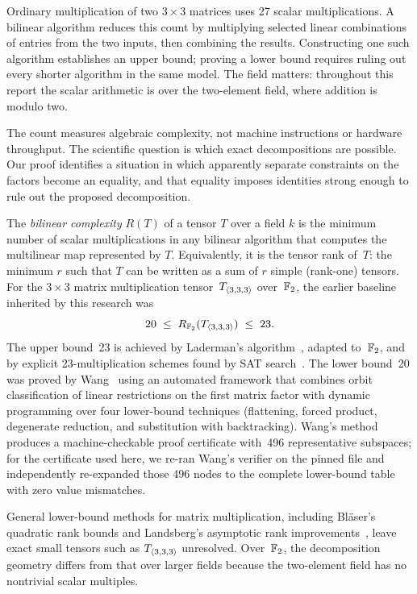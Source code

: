 \documentclass[11pt,a4paper]{article}
\begin{document}
Ordinary multiplication of two $3\times3$ matrices uses 27 scalar
multiplications. A bilinear algorithm reduces this count by multiplying selected
linear combinations of entries from the two inputs, then combining the
results. Constructing one such algorithm establishes an upper bound;
proving a lower bound requires ruling out every shorter algorithm in the
same model. The field matters: throughout this report the scalar arithmetic
is over the two-element field, where addition is modulo two.

The count measures algebraic complexity, not machine instructions or
hardware throughput. The scientific question is which exact decompositions
are possible. Our proof identifies a situation in which apparently separate
constraints on the factors become an equality, and that equality imposes
identities strong enough to rule out the proposed decomposition.

The \emph{bilinear complexity} $R(T)$ of a tensor $T$ over a field $k$ is the minimum number of scalar multiplications in any bilinear algorithm that computes the multilinear map represented by $T$.  Equivalently, it is the tensor rank of~$T$: the minimum $r$ such that $T$ can be written as a sum of $r$ simple (rank-one) tensors. For the $3\times3$ matrix multiplication tensor~$T_{\langle3,3,3\rangle}$ over~$\mathbb{F}_2$, the earlier baseline inherited by this research was
\[
  20\;\le\;R_{\mathbb{F}_2}(T_{\langle3,3,3\rangle})\;\le\;23.
\]
The upper bound~23 is achieved by Laderman's algorithm~\cite{laderman1976noncommutative}, adapted to~$\mathbb{F}_2$, and by explicit 23-multiplication schemes found by SAT search~\cite{heule2019waysa}.  The lower bound~20 was proved by Wang~\cite{wangautomated} using an automated framework that combines orbit classification of linear restrictions on the first matrix factor with dynamic programming over four lower-bound techniques (flattening, forced product, degenerate reduction, and substitution with backtracking).  Wang's method produces a machine-checkable proof certificate with~496 representative subspaces; for the certificate used here, we re-ran Wang's verifier on the pinned file and independently re-expanded those 496 nodes to the complete lower-bound table with zero value mismatches.

General lower-bound methods for matrix multiplication, including Bläser's quadratic rank bounds and Landsberg's asymptotic rank improvements~\cite{blaser1999focs,landsberg2012lower}, leave exact small tensors such as $T_{\langle3,3,3\rangle}$ unresolved. Over~$\mathbb{F}_2$, the decomposition geometry differs from that over larger fields because the two-element field has no nontrivial scalar multiples.
\end{document}
